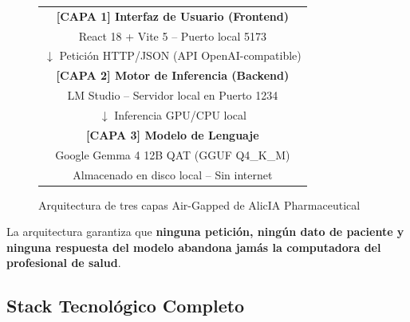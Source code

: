 \documentclass[12pt,a4paper]{article}
\begin{document}
\begin{figure}[H]
  \centering
  \begin{tcolorbox}[colback=lightgray, colframe=primary, width=\textwidth]
    \centering
    \begin{tabular}{c}
      \textbf{[CAPA 1] Interfaz de Usuario (Frontend)}\\
      React 18 + Vite 5 -- Puerto local 5173\\[0.5em]
      $\downarrow$ Petición HTTP/JSON (API OpenAI-compatible)\\[0.5em]
      \textbf{[CAPA 2] Motor de Inferencia (Backend)}\\
      LM Studio -- Servidor local en Puerto 1234\\[0.5em]
      $\downarrow$ Inferencia GPU/CPU local\\[0.5em]
      \textbf{[CAPA 3] Modelo de Lenguaje}\\
      Google Gemma 4 12B QAT (GGUF Q4\_K\_M)\\
      Almacenado en disco local -- Sin internet
    \end{tabular}
  \end{tcolorbox}
  \caption{Arquitectura de tres capas Air-Gapped de AlicIA Pharmaceutical}
\end{figure}

\noindent La arquitectura garantiza que \textbf{ninguna petición, ningún dato de paciente y ninguna
respuesta del modelo abandona jamás la computadora del profesional de salud}.

\subsection{Stack Tecnológico Completo}
\end{document}
